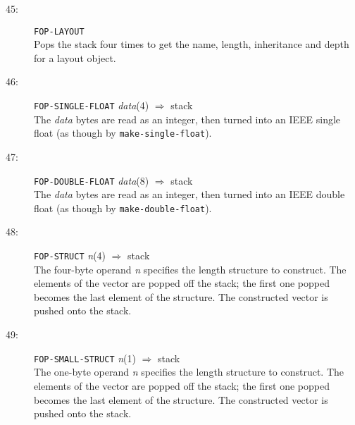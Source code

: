 \begin{description}
\item[45:] \hspace{2em} {\tt FOP-LAYOUT} \hspace{2em} \\
Pops the stack four times to get the name, length, inheritance and depth for a layout object. 

\item[46:] \hspace{2em} {\tt FOP-SINGLE-FLOAT} \hspace{2em} {\it data}(4) \hspace{2em}
$\Rightarrow$ \hspace{2em} stack \\
The {\it data} bytes are read as an integer, then turned into an IEEE single
float (as though by {\tt make-single-float}).

\item[47:] \hspace{2em} {\tt FOP-DOUBLE-FLOAT} \hspace{2em} {\it data}(8) \hspace{2em}
$\Rightarrow$ \hspace{2em} stack \\
The {\it data} bytes are read as an integer, then turned into an IEEE double
float (as though by {\tt make-double-float}).

\item[48:] \hspace{2em} {\tt FOP-STRUCT} \hspace{2em} {\it n}(4) \hspace{2em} $\Rightarrow$ \hspace{2em} stack \\
The four-byte operand {\it n} specifies the length structure to construct.  The
elements of the vector are popped off the stack; the first one popped becomes
the last element of the structure.  The constructed vector is pushed onto the
stack.

\item[49:] \hspace{2em} {\tt FOP-SMALL-STRUCT} \hspace{2em} {\it n}(1) \hspace{2em} $\Rightarrow$ \hspace{2em} stack \\
The one-byte operand {\it n} specifies the length structure to construct.  The
elements of the vector are popped off the stack; the first one popped becomes
the last element of the structure.  The constructed vector is pushed onto the
stack.


\end{description}
